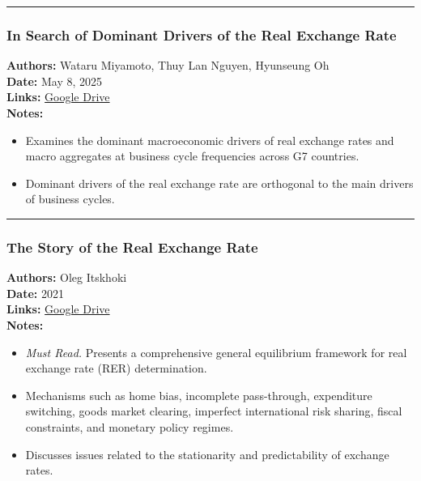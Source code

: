 \documentclass[
  11pt,
]{article}
\providecommand{\tightlist}{%
  \setlength{\itemsep}{0pt}\setlength{\parskip}{0pt}}
\begin{document}
\begin{center}\rule{0.5\linewidth}{0.5pt}\end{center}

\subsubsection{In Search of Dominant Drivers of the Real Exchange
Rate}\label{in-search-of-dominant-drivers-of-the-real-exchange-rate}

\textbf{Authors:} Wataru Miyamoto, Thuy Lan Nguyen, Hyunseung Oh\\
\textbf{Date:} May 8, 2025\\
\textbf{Links:}
\href{https://drive.google.com/file/d/1v1P90qYEBl_1tm_MXqShOefqqOm5Fr2j/view?usp=sharing}{Google
Drive}\\
\textbf{Notes:}

\begin{itemize}
\tightlist
\item
  Examines the dominant macroeconomic drivers of real exchange rates and
  macro aggregates at business cycle frequencies across G7 countries.
\item
  Dominant drivers of the real exchange rate are orthogonal to the main
  drivers of business cycles.
\end{itemize}

\begin{center}\rule{0.5\linewidth}{0.5pt}\end{center}

\subsubsection{The Story of the Real Exchange
Rate}\label{the-story-of-the-real-exchange-rate}

\textbf{Authors:} Oleg Itskhoki\\
\textbf{Date:} 2021\\
\textbf{Links:}
\href{https://drive.google.com/file/d/1vhVbum9po2xoiaPT8suUqOqjDg5o8EkI/view?usp=sharing}{Google
Drive}\\
\textbf{Notes:}

\begin{itemize}
\tightlist
\item
  \emph{Must Read.} Presents a comprehensive general equilibrium
  framework for real exchange rate (RER) determination.
\item
  Mechanisms such as home bias, incomplete pass-through, expenditure
  switching, goods market clearing, imperfect international risk
  sharing, fiscal constraints, and monetary policy regimes.
\item
  Discusses issues related to the stationarity and predictability of
  exchange rates.
\end{itemize}
\end{document}
